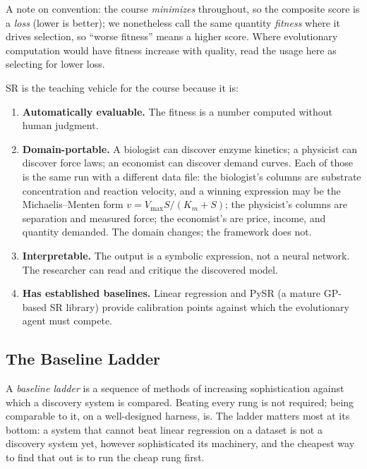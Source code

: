 A note on convention: the course \emph{minimizes} throughout, so the composite score is a \emph{loss} (lower is better); we nonetheless call the same quantity \emph{fitness} where it drives selection, so ``worse fitness'' means a higher score.
Where evolutionary computation would have fitness increase with quality, read the usage here as selecting for lower loss.

SR is the teaching vehicle for the course because it is:
\begin{enumerate}
\item \textbf{Automatically evaluable.} The fitness is a number computed without human judgment.
\item \textbf{Domain-portable.} A biologist can discover enzyme kinetics; a physicist can discover force laws; an economist can discover demand curves.
Each of those is the same run with a different data file: the biologist's columns are substrate concentration and reaction velocity, and a winning expression may be the Michaelis--Menten form $v = V_{\max} S / (K_m + S)$; the physicist's columns are separation and measured force; the economist's are price, income, and quantity demanded.
The domain changes; the framework does not.
\item \textbf{Interpretable.} The output is a symbolic expression, not a neural network.
The researcher can read and critique the discovered model.
\item \textbf{Has established baselines.} Linear regression and PySR (a mature GP-based SR library) provide calibration points against which the evolutionary agent must compete.
\end{enumerate}

\subsection{The Baseline Ladder}

A \emph{baseline ladder} is a sequence of methods of increasing sophistication against which a discovery system is compared.
Beating every rung is not required; being comparable to it, on a well-designed harness, is.
The ladder matters most at its bottom: a system that cannot beat linear regression on a dataset is not a discovery system yet, however sophisticated its machinery, and the cheapest way to find that out is to run the cheap rung first.

